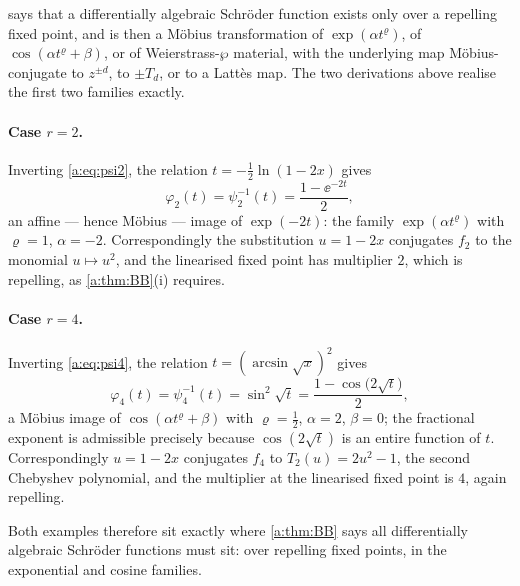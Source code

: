  says that a differentially algebraic Schröder function exists only
over a repelling fixed point, and is then a Möbius transformation of
$\exp(\alpha t^{\varrho})$, of $\cos(\alpha t^{\varrho}+\beta)$, or of
Weierstrass-$\wp$ material, with the underlying map Möbius-conjugate to $z^{\pm d}$,
to $\pm T_d$, or to a Lattès map. The two derivations above realise the first two
families exactly.

\paragraph{Case $r=2$.}
Inverting \cref{a:eq:psi2}, the relation $t = -\tfrac12\ln(1-2x)$ gives
\begin{equation*}
\varphi_2(t) = \psi_2^{-1}(t) = \frac{1-\ee^{-2t}}{2},
\end{equation*}
an affine --- hence Möbius --- image of $\exp(-2t)$: the family
$\exp(\alpha t^{\varrho})$ with $\varrho=1$, $\alpha=-2$. Correspondingly the
substitution $u=1-2x$ conjugates $f_2$ to the monomial $u\mapsto u^2$, and the
linearised fixed point has multiplier $2$, which is repelling, as
\cref{a:thm:BB}(i) requires.

\paragraph{Case $r=4$.}
Inverting \cref{a:eq:psi4}, the relation $t = (\arcsin\sqrt x)^2$ gives
\begin{equation*}
\varphi_4(t) = \psi_4^{-1}(t) = \sin^2\!\sqrt t = \frac{1-\cos\bigl(2\sqrt t\bigr)}{2},
\end{equation*}
a Möbius image of $\cos(\alpha t^{\varrho}+\beta)$ with $\varrho=\tfrac12$,
$\alpha=2$, $\beta=0$; the fractional exponent is admissible precisely because
$\cos(2\sqrt t)$ is an entire function of $t$. Correspondingly $u=1-2x$ conjugates
$f_4$ to $T_2(u) = 2u^2-1$, the second Chebyshev polynomial, and the multiplier at
the linearised fixed point is $4$, again repelling.

Both examples therefore sit exactly where \cref{a:thm:BB} says all differentially
algebraic Schröder functions must sit: over repelling fixed points, in the
exponential and cosine families.

